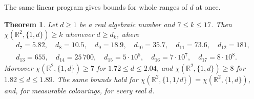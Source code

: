 \documentclass[11pt,a4paper]{amsart}
\newtheorem{theorem}{Theorem}
\theoremstyle{definition}
\theoremstyle{remark}
\newcommand{\R}{\mathbb{R}}
\begin{document}
The same linear program gives bounds for whole ranges of $d$ at once.

\begin{theorem}\label{thm:uniform}
Let $d\ge1$ be a real algebraic number and $7\le k\le17$. Then $\chi(\R^2,\{1,d\})\ge k$ whenever $d\ge d_k$, where
\begin{gather*}
d_7=5.82,\quad d_8=10.5,\quad d_9=18.9,\quad d_{10}=35.7,\quad d_{11}=73.6,\quad d_{12}=181,\\
d_{13}=655,\quad d_{14}=25\,700,\quad d_{15}=5\cdot10^5,\quad d_{16}=7\cdot10^7,\quad d_{17}=8\cdot10^8.
\end{gather*}
Moreover $\chi(\R^2,\{1,d\})\ge7$ for $1.72\le d\le2.04$, and $\chi(\R^2,\{1,d\})\ge8$ for $1.82\le d\le1.89$. The
same bounds hold for $\chi(\R^2,\{1,1/d\})=\chi(\R^2,\{1,d\})$, and, for measurable colourings, for every real
$d$.
\end{theorem}
\end{document}
